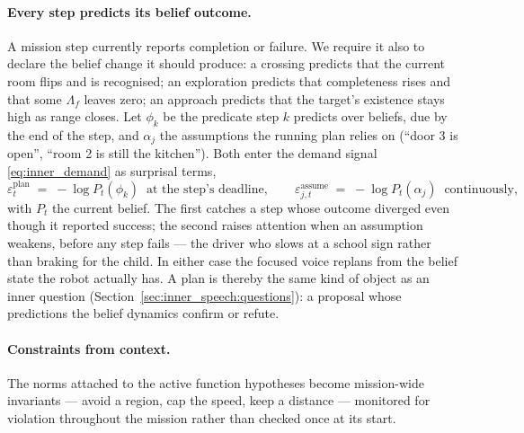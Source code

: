 \paragraph{Every step predicts its belief outcome.}
A mission step currently reports completion or failure. We require it also to declare the belief change it should
produce: a crossing predicts that the current room flips and is recognised; an exploration predicts that completeness
rises and that some $\Lambda_f$ leaves zero; an approach predicts that the target's existence stays high as range
closes. Let $\phi_k$ be the predicate step $k$ predicts over beliefs, due by the end of the step, and $\alpha_j$ the
assumptions the running plan relies on (``door 3 is open'', ``room 2 is still the kitchen''). Both enter the demand
signal \eqref{eq:inner_demand} as surprisal terms,
\begin{equation}
    \varepsilon^{\text{plan}}_t \;=\; -\log P_t(\phi_k) \;\;\text{at the step's deadline},
    \qquad
    \varepsilon^{\text{assume}}_{j,t} \;=\; -\log P_t(\alpha_j) \;\;\text{continuously},
    \label{eq:lh_plan_surprise}
\end{equation}
with $P_t$ the current belief. The first catches a step whose outcome diverged even though it reported success; the
second raises attention when an assumption weakens, before any step fails --- the driver who slows at a school sign
rather than braking for the child. In either case the focused voice replans from the belief state the robot actually
has. A plan is thereby the same kind of object as an inner question (Section~\ref{sec:inner_speech:questions}): a
proposal whose predictions the belief dynamics confirm or refute.

\paragraph{Constraints from context.}
The norms attached to the active function hypotheses become mission-wide invariants --- avoid a region, cap the speed,
keep a distance --- monitored for violation throughout the mission rather than checked once at its start.

